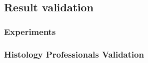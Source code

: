 \documentclass[../main.tex]{subfiles}
\begin{document}
\subsection{Result validation}
\label{result-validation}
\lipsum[1]

\subsubsection{Experiments}
\lipsum[2]

\subsubsection{Histology Professionals Validation}
\lipsum[3]
\end{document}
